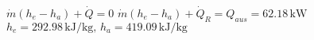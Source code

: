 \( \dot{m} (h_e - h_a) + \dot{Q} = 0 \)  
\( \dot{m} (h_e - h_a) + \dot{Q}_R = Q_{aus} = 62.18 \, \text{kW} \)  
\( h_e = 292.98 \, \text{kJ/kg}, \, h_a = 419.09 \, \text{kJ/kg} \)